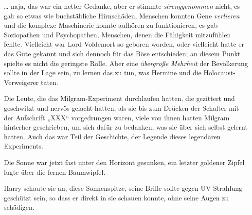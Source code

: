 … naja, das war ein netter Gedanke, aber er stimmte \emph{strenggenommen} nicht, es gab so etwas wie buchstäbliche Hirnschäden, Menschen konnten Gene \emph{verlieren} und die komplexe Maschinerie konnte aufhören zu funktionieren, es gab Soziopathen und Psychopathen, Menschen, denen die Fähigkeit mitzufühlen fehlte. Vielleicht war Lord Voldemort so geboren worden, oder vielleicht hatte er das Gute gekannt und sich dennoch für das Böse entschieden; an diesem Punkt spielte es nicht die geringste Rolle. Aber eine \emph{übergroße Mehrheit} der Bevölkerung sollte in der Lage sein, zu lernen das zu tun, was Hermine und die Holocaust-Verweigerer taten.

Die Leute, die das Milgram-Experiment durchlaufen hatten, die gezittert und geschwitzt und nervös gelacht hatten, als sie bis zum Drücken der Schalter mit der Aufschrift
„XXX“ vorgedrungen waren, viele von ihnen hatten Milgram hinterher geschrieben, um sich dafür zu bedanken, was sie über sich selbst gelernt hatten. Auch das war Teil der Geschichte, der Legende dieses legendären Experiments.

Die Sonne war jetzt fast unter den Horizont gesunken, ein letzter goldener Zipfel lugte über die fernen Baumwipfel.

Harry schaute sie an, diese Sonnenspitze, seine Brille sollte gegen UV-Strahlung geschützt sein, so dass er direkt in sie schauen konnte, ohne seine Augen zu schädigen.

